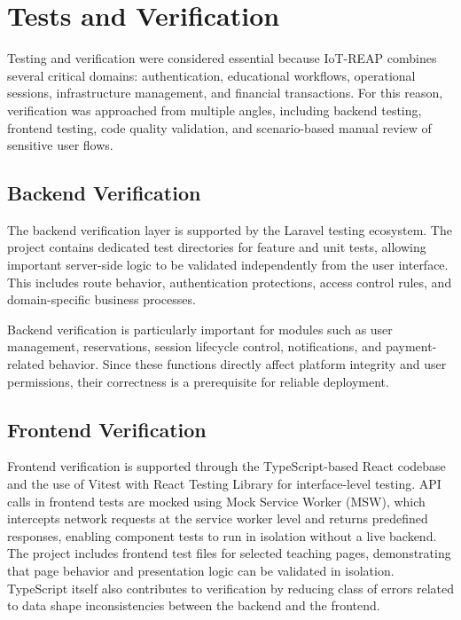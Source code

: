 \section{Tests and Verification}

Testing and verification were considered essential because IoT-REAP combines several critical domains: authentication, educational workflows, operational sessions, infrastructure management, and financial transactions. For this reason, verification was approached from multiple angles, including backend testing, frontend testing, code quality validation, and scenario-based manual review of sensitive user flows.

\subsection{Backend Verification}

The backend verification layer is supported by the Laravel testing ecosystem. The project contains dedicated test directories for feature and unit tests, allowing important server-side logic to be validated independently from the user interface. This includes route behavior, authentication protections, access control rules, and domain-specific business processes.

Backend verification is particularly important for modules such as user management, reservations, session lifecycle control, notifications, and payment-related behavior. Since these functions directly affect platform integrity and user permissions, their correctness is a prerequisite for reliable deployment.

\subsection{Frontend Verification}

Frontend verification is supported through the TypeScript-based React codebase and the use of Vitest with React Testing Library for interface-level testing. API calls in frontend tests are mocked using Mock Service Worker (MSW), which intercepts network requests at the service worker level and returns predefined responses, enabling component tests to run in isolation without a live backend. The project includes frontend test files for selected teaching pages, demonstrating that page behavior and presentation logic can be validated in isolation. TypeScript itself also contributes to verification by reducing class of errors related to data shape inconsistencies between the backend and the frontend.

